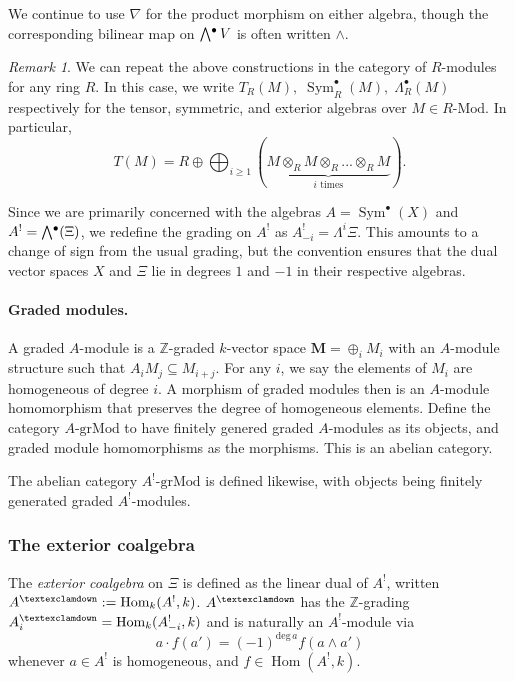 \documentclass[a4paper]{article}
\theoremstyle{definition}
\theoremstyle{remark}
\newtheorem{remark}[defn]{Remark}
\newcommand{\Exter}{\mathchoice{{\textstyle\bigwedge}}%
    {{\bigwedge}}%
    {{\textstyle\wedge}}%
    {{\scriptstyle\wedge}}}
\newcommand{\grMod}{\ensuremath{\text{-grMod}}}
\newcommand{\Mod}{\ensuremath{\text{-Mod}}}
\DeclareMathOperator{\Sym}{\text{Sym}}
\DeclareMathOperator{\exterior}{\Exter^\bullet}
\DeclareMathOperator{\Hom}{\text{Hom}}
\newcommand{\gnab}{{\textexclamdown}}
\begin{document}
We continue to use \(\nabla\) for the product morphism on either algebra,
though the corresponding bilinear map on \(\exterior{V}\) is often written
\(\wedge\).

\begin{remark} 
    We can repeat the above constructions in the category of \(R\)-modules for
    any ring \(R\). In this case, we write \(T_R(M),\; \Sym^\bullet_R(M),\;
    \Lambda^\bullet_R(M)\) respectively for the tensor, symmetric, and exterior
    algebras over \(M\in R\Mod\). In particular,
    \[ T(M) = R \oplus \bigoplus_{i\geq 1}(\underbrace{M\otimes_R M\otimes_R ...
    \otimes_R M}_{i\text{ times}}).\]
\end{remark}

Since we are primarily concerned with the algebras \(A=\Sym^\bullet(X)\) and
\(A^!=\exterior(\Xi)\), we redefine the grading on \(A^!\) as
\(A^!_{-i}=\Lambda^i \Xi\). This amounts to a change of sign from the usual
grading, but the convention ensures that the dual vector spaces \(X\) and
\(\Xi\) lie in degrees \(1\) and \(-1\) in their respective algebras.

\paragraph{Graded modules.} A graded \(A\)-module is a \(\mathbb{Z}\)-graded
\(k\)-vector space \(\mathbf{M} = \oplus_i M_i\) with an \(A\)-module structure
such that \(A_iM_j \subseteq M_{i+j}\). For any \(i\), we say the elements of
\(M_i\) are homogeneous of degree \(i\). A morphism of graded modules then is an
\(A\)-module homomorphism that preserves the degree of homogeneous elements.
Define the category \(A\grMod\) to have  finitely genered graded \(A\)-modules
as its objects, and graded module homomorphisms as the morphisms. This is an
abelian category.

The abelian category \(A^!\grMod\) is defined likewise, with objects being
finitely generated graded \(A^!\)-modules.

\subsubsection{The exterior coalgebra}
\label{subsubsec-exteriorcoalgebra}

The \textit{exterior coalgebra} on \(\Xi\) is defined as the linear dual of
\(A^!\), written \(A^\gnab := \Hom_k(A^!, k)\). \(A^\gnab\) has the
\(\mathbb{Z}\)-grading \(A^\gnab_i=\Hom_k(A^!_{-i}, k)\) and is naturally an
\(A^!\)-module via \[a \cdot f(a') = (-1)^{\text{deg}\, a} f(a\wedge a')\]
whenever \(a\in A^!\) is homogeneous, and \(f\in \Hom(A^!,k)\). 
\end{document}
